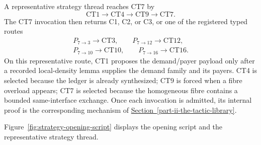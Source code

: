 \documentclass[
  11pt,
]{article}
\theoremstyle{definition}
\newcommand{\secref}[1]{\hyperref[#1]{Section~\ref*{#1}}}
\begin{document}
A representative strategy thread reaches CT7 by
\[
\text{CT1}\to\text{CT4}\to\text{CT9}\to\text{CT7}.
\]
The CT7 invocation then returns C1, C2, or C3, or one of the registered
typed routes
\[
\begin{gathered}
P_{7\to3}\to\text{CT3},\qquad
P_{7\to12}\to\text{CT12},\\
P_{7\to10}\to\text{CT10},\qquad
P_{7\to16}\to\text{CT16}.
\end{gathered}
\]
On this representative route, CT1 proposes the demand/payer payload only
after a recorded local-density lemma supplies the demand family and its
payers. CT4 is selected because the ledger is already synthesized; CT9
is forced when a fibre overload appears; CT7 is selected because the
homogeneous fibre contains a bounded same-interface exchange. Once each
invocation is admitted, its internal proof is the corresponding
mechanism of \secref{part-ii-the-tactic-library}.

Figure~\ref{fig:strategy-opening-script} displays the opening script and
the representative strategy thread.
\end{document}
